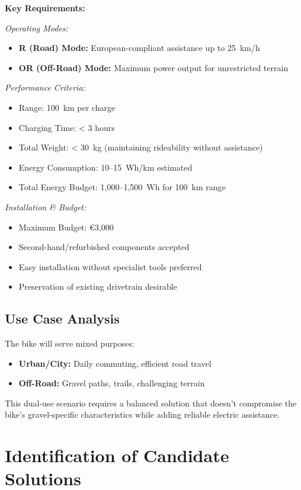 \documentclass[12pt,a4paper]{article}
\begin{document}
\textbf{Key Requirements:}

\textit{Operating Modes:}
\begin{itemize}
    \item \textbf{R (Road) Mode:} European-compliant assistance up to 25~km/h \cite{eu-regulation}
    \item \textbf{OR (Off-Road) Mode:} Maximum power output for unrestricted terrain
\end{itemize}

\textit{Performance Criteria:}
\begin{itemize}
    \item Range: 100~km per charge
    \item Charging Time: < 3 hours
    \item Total Weight: < 30~kg (maintaining rideability without assistance)
    \item Energy Consumption: 10--15~Wh/km estimated
    \item Total Energy Budget: 1,000--1,500~Wh for 100~km range
\end{itemize}

\textit{Installation \& Budget:}
\begin{itemize}
    \item Maximum Budget: €3,000
    \item Second-hand/refurbished components accepted
    \item Easy installation without specialist tools preferred
    \item Preservation of existing drivetrain desirable
\end{itemize}

\subsection{Use Case Analysis}

The bike will serve mixed purposes:
\begin{itemize}
    \item \textbf{Urban/City:} Daily commuting, efficient road travel
    \item \textbf{Off-Road:} Gravel paths, trails, challenging terrain
\end{itemize}

This dual-use scenario requires a balanced solution that doesn't compromise the bike's gravel-specific characteristics while adding reliable electric assistance.

\section{Identification of Candidate Solutions}
\end{document}
